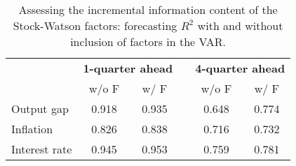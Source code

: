 \begin{table}
\centering
\begin{tabular}{lccccc} \toprule \toprule
              & \multicolumn{2}{c}{\textbf{1-quarter ahead}}              &        & \multicolumn{2}{c}{\textbf{4-quarter ahead}}                         \\
\cline{2-3} \cline{5-6}
              & w/o F & w/ F & & w/o F & w/ F \\
\midrule
Output gap & 0.918 & 0.935 &  & 0.648 & 0.774 \\
Inflation & 0.826 & 0.838 &  & 0.716 & 0.732 \\
Interest rate & 0.945 & 0.953 &  & 0.759 & 0.781 \\
\bottomrule
\end{tabular}
\caption{Assessing the incremental information content of the Stock-Watson factors: forecasting $R^2$ with and without inclusion of factors in the VAR.}
\label{tab:stock_watson_compare}
\end{table}
